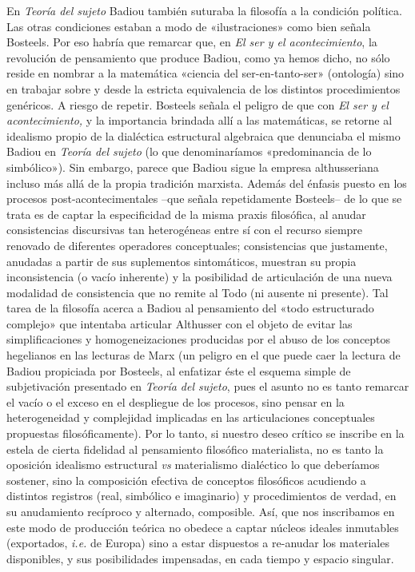 En \emph{Teoría del sujeto} Badiou también suturaba la filosofía a la condición política. Las otras condiciones estaban a modo de «ilustraciones» como bien señala Bosteels. Por eso habría que remarcar que, en \emph{El ser y el acontecimiento}, la revolución de pensamiento que produce Badiou, como ya hemos dicho, no sólo reside en nombrar a la matemática «ciencia del ser-en-tanto-ser» (ontología) sino en trabajar sobre y desde la estricta equivalencia de los distintos procedimientos genéricos. A riesgo de repetir. Bosteels señala el peligro de que con \emph{El ser y el acontecimiento,} y la importancia brindada allí a las matemáticas, se retorne al idealismo propio de la dialéctica estructural algebraica que denunciaba el mismo Badiou en \emph{Teoría del sujeto} (lo que denominaríamos «predominancia de lo simbólico»). Sin embargo, parece que Badiou sigue la empresa althusseriana incluso más allá de la propia tradición marxista. Además del énfasis puesto en los procesos post-acontecimentales --que señala repetidamente Bosteels-- de lo que se trata es de captar la especificidad de la misma praxis filosófica, al anudar consistencias discursivas tan heterogéneas entre sí con el recurso siempre renovado de diferentes operadores conceptuales; consistencias que justamente, anudadas a partir de sus suplementos sintomáticos, muestran su propia inconsistencia (o vacío inherente) y la posibilidad de articulación de una nueva modalidad de consistencia que no remite al Todo (ni ausente ni presente). Tal tarea de la filosofía acerca a Badiou al pensamiento del «todo estructurado complejo» que intentaba articular Althusser con el objeto de evitar las simplificaciones y homogeneizaciones producidas por el abuso de los conceptos hegelianos en las lecturas de Marx (un peligro en el que puede caer la lectura de Badiou propiciada por Bosteels, al enfatizar éste el esquema simple de subjetivación presentado en \emph{Teoría del sujeto}, pues el asunto no es tanto remarcar el vacío o el exceso en el despliegue de los procesos, sino pensar en la heterogeneidad y complejidad implicadas en las articulaciones conceptuales propuestas filosóficamente). Por lo tanto, si nuestro deseo crítico se inscribe en la estela de cierta fidelidad al pensamiento filosófico materialista, no es tanto la oposición idealismo estructural \emph{vs} materialismo dialéctico lo que deberíamos sostener, sino la composición efectiva de conceptos filosóficos acudiendo a distintos registros (real, simbólico e imaginario) y procedimientos de verdad, en su anudamiento recíproco y alternado, composible. Así, que nos inscribamos en este modo de producción teórica no obedece a captar núcleos ideales inmutables (exportados, \emph{i.e.} de Europa) sino a estar dispuestos a re-anudar los materiales disponibles, y sus posibilidades impensadas, en cada tiempo y espacio singular.

